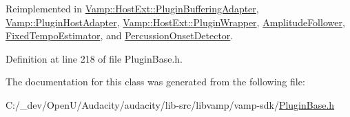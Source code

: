 Reimplemented in \hyperlink{class_vamp_1_1_host_ext_1_1_plugin_buffering_adapter_a7a979b20c169d37adbd7b7d8b8a077b3}{Vamp\+::\+Host\+Ext\+::\+Plugin\+Buffering\+Adapter}, \hyperlink{class_vamp_1_1_plugin_host_adapter_a29f75395aa75b9de0228aa11edf9c6d6}{Vamp\+::\+Plugin\+Host\+Adapter}, \hyperlink{class_vamp_1_1_host_ext_1_1_plugin_wrapper_a651b15a5dc4c27942ac0c87c6092bfe5}{Vamp\+::\+Host\+Ext\+::\+Plugin\+Wrapper}, \hyperlink{class_amplitude_follower_ae1fc37ece4d20e40f3066a3361a99340}{Amplitude\+Follower}, \hyperlink{class_fixed_tempo_estimator_a8a5a413025384cf451c64d2c2ce13a75}{Fixed\+Tempo\+Estimator}, and \hyperlink{class_percussion_onset_detector_aa097d72488e1211f05fc661ff5c6dc01}{Percussion\+Onset\+Detector}.



Definition at line 218 of file Plugin\+Base.\+h.



The documentation for this class was generated from the following file\+:\begin{DoxyCompactItemize}
\item 
C\+:/\+\_\+dev/\+Open\+U/\+Audacity/audacity/lib-\/src/libvamp/vamp-\/sdk/\hyperlink{vamp-sdk_2_plugin_base_8h}{Plugin\+Base.\+h}\end{DoxyCompactItemize}
